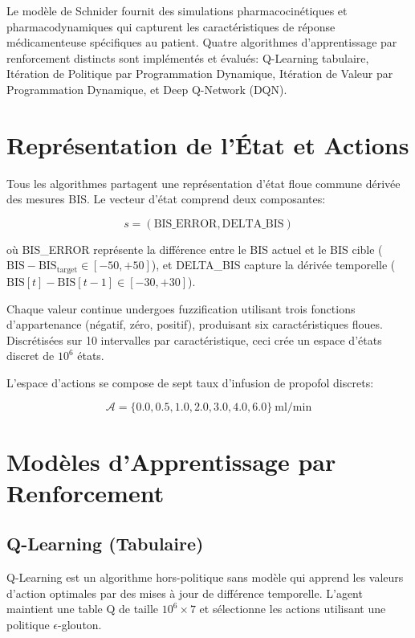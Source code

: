\documentclass[12pt,a4paper]{article}
\begin{document}
Le modèle de Schnider fournit des simulations pharmacocinétiques et pharmacodynamiques qui capturent les caractéristiques de réponse médicamenteuse spécifiques au patient. Quatre algorithmes d'apprentissage par renforcement distincts sont implémentés et évalués: Q-Learning tabulaire, Itération de Politique par Programmation Dynamique, Itération de Valeur par Programmation Dynamique, et Deep Q-Network (DQN).

\section{Représentation de l'État et Actions}

Tous les algorithmes partagent une représentation d'état floue commune dérivée des mesures BIS. Le vecteur d'état comprend deux composantes:

\begin{equation}
    s = (\text{BIS\_ERROR}, \text{DELTA\_BIS})
\end{equation}

où BIS\_ERROR représente la différence entre le BIS actuel et le BIS cible ($\text{BIS} - \text{BIS}_{\text{target}} \in [-50, +50]$), et DELTA\_BIS capture la dérivée temporelle ($\text{BIS}[t] - \text{BIS}[t-1] \in [-30, +30]$).

Chaque valeur continue undergoes fuzzification utilisant trois fonctions d'appartenance (négatif, zéro, positif), produisant six caractéristiques floues. Discrétisées sur 10 intervalles par caractéristique, ceci crée un espace d'états discret de $10^6$ états.

L'espace d'actions se compose de sept taux d'infusion de propofol discrets:

\begin{equation}
    \mathcal{A} = \{0.0, 0.5, 1.0, 2.0, 3.0, 4.0, 6.0\} \ \text{ml/min}
\end{equation}

\section{Modèles d'Apprentissage par Renforcement}

\subsection{Q-Learning (Tabulaire)}

Q-Learning est un algorithme hors-politique sans modèle qui apprend les valeurs d'action optimales par des mises à jour de différence temporelle. L'agent maintient une table Q de taille $10^6 \times 7$ et sélectionne les actions utilisant une politique $\epsilon$-glouton.
\end{document}
